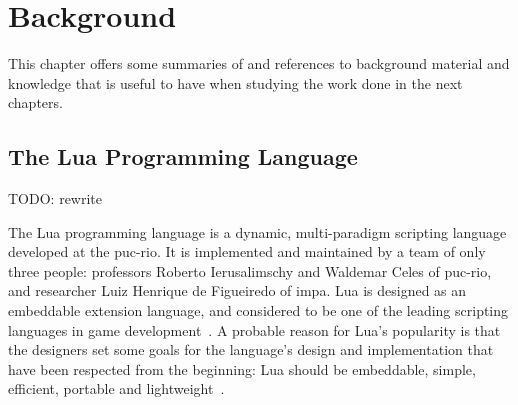\chapter{Background}
\label{chp:background}
This chapter offers some summaries of and references to background material and knowledge that is useful to have when studying the work done in the next chapters. 

\section{The Lua Programming Language}
\label{sec:lua_language}
TODO: rewrite

The Lua programming language is a dynamic, multi-paradigm scripting language developed at the \gls{puc-rio}. It is implemented and maintained by a team of only three people: professors Roberto Ierusalimschy and Waldemar Celes of \gls{puc-rio}, and researcher Luiz Henrique de Figueiredo of \gls{impa}. Lua is designed as an embeddable extension language, and considered to be one of the leading scripting languages in game development~\cite{inproceedings:the_evolution_of_lua}. A probable reason for Lua's popularity is that the designers set some goals for the language's design and implementation that have been respected from the beginning: Lua should be embeddable, simple, efficient, portable and lightweight~\cite{article:the_implementation_of_lua}.

